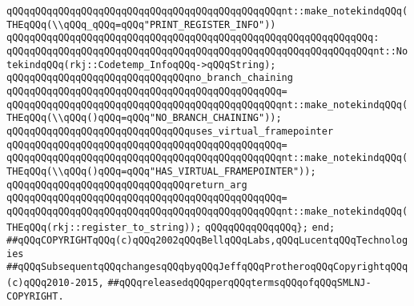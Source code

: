 \verb|qQQqqQQqqQQqqQQqqQQqqQQqqQQqqQQqqQQqqQQqqQQqqQQqnt::make_notekindqQQq(THEqQQq(\\qQQq_qQQq=qQQq"PRINT_REGISTER_INFO"))|\newline
\verb|qQQqqQQqqQQqqQQqqQQqqQQqqQQqqQQqqQQqqQQqqQQqqQQqqQQqqQQqqQQqqQQq:|\newline
\verb|qQQqqQQqqQQqqQQqqQQqqQQqqQQqqQQqqQQqqQQqqQQqqQQqqQQqqQQqqQQqqQQqnt::NotekindqQQq(rkj::Codetemp_InfoqQQq->qQQqString);|\newline
\newline
\newline
\verb|qQQqqQQqqQQqqQQqqQQqqQQqqQQqqQQqno_branch_chaining|\newline
\verb|qQQqqQQqqQQqqQQqqQQqqQQqqQQqqQQqqQQqqQQqqQQqqQQq=|\newline
\verb|qQQqqQQqqQQqqQQqqQQqqQQqqQQqqQQqqQQqqQQqqQQqqQQqnt::make_notekindqQQq(THEqQQq(\\qQQq()qQQq=qQQq"NO_BRANCH_CHAINING"));|\newline
\newline
\newline
\verb|qQQqqQQqqQQqqQQqqQQqqQQqqQQqqQQquses_virtual_framepointer|\newline
\verb|qQQqqQQqqQQqqQQqqQQqqQQqqQQqqQQqqQQqqQQqqQQqqQQq=|\newline
\verb|qQQqqQQqqQQqqQQqqQQqqQQqqQQqqQQqqQQqqQQqqQQqqQQqnt::make_notekindqQQq(THEqQQq(\\qQQq()qQQq=qQQq"HAS_VIRTUAL_FRAMEPOINTER"));|\newline
\newline
\newline
\verb|qQQqqQQqqQQqqQQqqQQqqQQqqQQqqQQqreturn_arg|\newline
\verb|qQQqqQQqqQQqqQQqqQQqqQQqqQQqqQQqqQQqqQQqqQQqqQQq=|\newline
\verb|qQQqqQQqqQQqqQQqqQQqqQQqqQQqqQQqqQQqqQQqqQQqqQQqnt::make_notekindqQQq(THEqQQq(rkj::register_to_string));|\newline
\newline
\verb|qQQqqQQqqQQqqQQq};|\newline
\verb|end;|\newline
\newline
\verb|##qQQqCOPYRIGHTqQQq(c)qQQq2002qQQqBellqQQqLabs,qQQqLucentqQQqTechnologies|\newline
\verb|##qQQqSubsequentqQQqchangesqQQqbyqQQqJeffqQQqProtheroqQQqCopyrightqQQq(c)qQQq2010-2015,|\newline
\verb|##qQQqreleasedqQQqperqQQqtermsqQQqofqQQqSMLNJ-COPYRIGHT.|\newline

